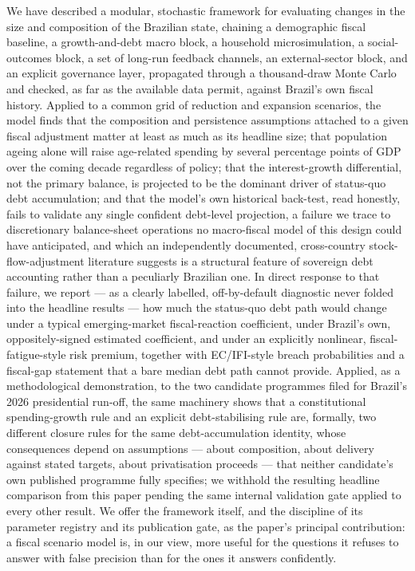 \documentclass[11pt,a4paper]{article}
\begin{document}
We have described a modular, stochastic framework for evaluating changes in the size and composition of the Brazilian state, chaining a demographic fiscal baseline, a growth-and-debt macro block, a household microsimulation, a social-outcomes block, a set of long-run feedback channels, an external-sector block, and an explicit governance layer, propagated through a thousand-draw Monte Carlo and checked, as far as the available data permit, against Brazil's own fiscal history. Applied to a common grid of reduction and expansion scenarios, the model finds that the composition and persistence assumptions attached to a given fiscal adjustment matter at least as much as its headline size; that population ageing alone will raise age-related spending by several percentage points of GDP over the coming decade regardless of policy; that the interest-growth differential, not the primary balance, is projected to be the dominant driver of status-quo debt accumulation; and that the model's own historical back-test, read honestly, fails to validate any single confident debt-level projection, a failure we trace to discretionary balance-sheet operations no macro-fiscal model of this design could have anticipated, and which an independently documented, cross-country stock-flow-adjustment literature suggests is a structural feature of sovereign debt accounting rather than a peculiarly Brazilian one. In direct response to that failure, we report --- as a clearly labelled, off-by-default diagnostic never folded into the headline results --- how much the status-quo debt path would change under a typical emerging-market fiscal-reaction coefficient, under Brazil's own, oppositely-signed estimated coefficient, and under an explicitly nonlinear, fiscal-fatigue-style risk premium, together with EC/IFI-style breach probabilities and a fiscal-gap statement that a bare median debt path cannot provide. Applied, as a methodological demonstration, to the two candidate programmes filed for Brazil's 2026 presidential run-off, the same machinery shows that a constitutional spending-growth rule and an explicit debt-stabilising rule are, formally, two different closure rules for the same debt-accumulation identity, whose consequences depend on assumptions --- about composition, about delivery against stated targets, about privatisation proceeds --- that neither candidate's own published programme fully specifies; we withhold the resulting headline comparison from this paper pending the same internal validation gate applied to every other result. We offer the framework itself, and the discipline of its parameter registry and its publication gate, as the paper's principal contribution: a fiscal scenario model is, in our view, more useful for the questions it refuses to answer with false precision than for the ones it answers confidently.
\end{document}
